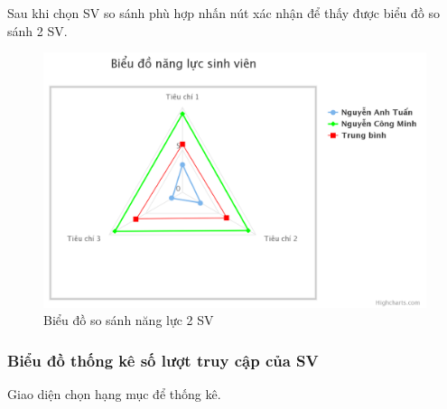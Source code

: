 Sau khi chọn SV so sánh phù hợp nhấn nút xác nhận để thấy được biểu đồ so sánh 2 SV.
\begin{center}
	\begin{figure}[htp]
		\begin{center}
			\includegraphics[width=0.8\linewidth]{img/25}
		\end{center}
		\caption{Biểu đồ so sánh năng lực 2 SV}
		\label{refhinh57}
	\end{figure}
\end{center}


\newpage
\subsubsection{Biểu đồ thống kê số lượt truy cập của SV}

Giao diện chọn hạng mục để thống kê.

